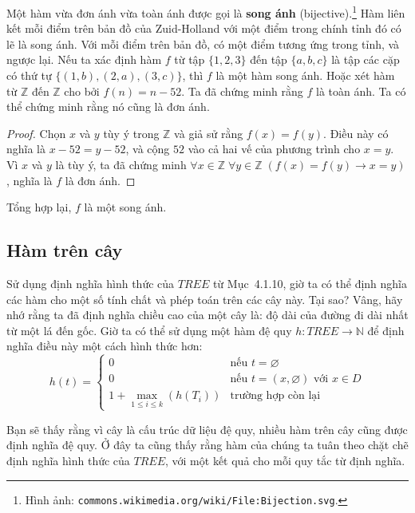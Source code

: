 Một hàm vừa đơn ánh vừa toàn ánh được gọi là \textbf{song ánh} (bijective).\footnote{Hình ảnh: \texttt{commons.wikimedia.org/wiki/File:Bijection.svg}.} Hàm liên kết mỗi điểm trên bản đồ của Zuid-Holland với một điểm trong chính tỉnh đó có lẽ là song ánh. Với mỗi điểm trên bản đồ, có một điểm tương ứng trong tỉnh, và ngược lại. Nếu ta xác định hàm $f$ từ tập $\{1,2,3\}$ đến tập $\{a,b,c\}$ là tập các cặp có thứ tự $\{(1,b),(2,a),(3,c)\}$, thì $f$ là một hàm song ánh. Hoặc xét hàm từ $\mathbb{Z}$ đến $\mathbb{Z}$ cho bởi $f(n) = n - 52$. Ta đã chứng minh rằng $f$ là toàn ánh. Ta có thể chứng minh rằng nó cũng là đơn ánh.

\begin{proof}
Chọn $x$ và $y$ tùy ý trong $\mathbb{Z}$ và giả sử rằng $f(x) = f(y)$. Điều này có nghĩa là $x - 52 = y - 52$, và cộng $52$ vào cả hai vế của phương trình cho $x = y$. Vì $x$ và $y$ là tùy ý, ta đã chứng minh $\forall x \in \mathbb{Z}\; \forall y \in \mathbb{Z}\; (f(x) = f(y) \to x = y)$, nghĩa là $f$ là đơn ánh.
\end{proof}

Tổng hợp lại, $f$ là một song ánh.

\subsection{Hàm trên cây}

Sử dụng định nghĩa hình thức của $\mathit{TREE}$ từ Mục~4.1.10, giờ ta có thể định nghĩa các hàm cho một số tính chất và phép toán trên các cây này. Tại sao? Vâng, hãy nhớ rằng ta đã định nghĩa chiều cao của một cây là: độ dài của đường đi dài nhất từ một lá đến gốc. Giờ ta có thể sử dụng một hàm đệ quy $h\colon \mathit{TREE} \to \mathbb{N}$ để định nghĩa điều này một cách hình thức hơn:
\[
h(t) = \begin{cases}
0 & \text{nếu } t = \varnothing \\
0 & \text{nếu } t = (x, \varnothing) \text{ với } x \in D \\
1 + \max_{1 \le i \le k}(h(T_i)) & \text{trường hợp còn lại}
\end{cases}
\]

Bạn sẽ thấy rằng vì cây là cấu trúc dữ liệu đệ quy, nhiều hàm trên cây cũng được định nghĩa đệ quy. Ở đây ta cũng thấy rằng hàm của chúng ta tuân theo chặt chẽ định nghĩa hình thức của $\mathit{TREE}$, với một kết quả cho mỗi quy tắc từ định nghĩa.

